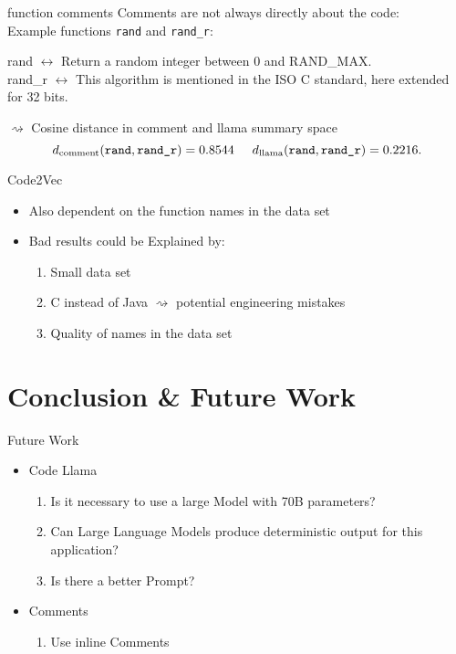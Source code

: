 \documentclass[aspectratio=1610,12pt]{beamer}
\begin{document}
\begin{frame}{function comments}
  Comments are not always directly about the code:\\
  Example functions \texttt{rand} and \texttt{rand\_r}:
  \begin{center}
    rand $\leftrightarrow$ Return a random integer between 0
      and RAND\_MAX.\\
    rand\_r  $\leftrightarrow$ This algorithm is mentioned in 
    the ISO C standard, here extended for 32 bits.
  \end{center}
  $\rightsquigarrow$ Cosine distance in comment and 
  llama summary space
    \[
      d_\text{comment}(\texttt{rand}, \texttt{rand\_r}) = 0.8544
      \hspace{0.5cm}
      d_\text{llama}(\texttt{rand}, \texttt{rand\_r}) = 0.2216.
    \]
\end{frame}

\begin{frame}{Code2Vec}
  \begin{itemize}
    \item Also dependent on the function names in the data set
    \item Bad results could be Explained by:
      \begin{enumerate}
        \item Small data set
        \item C instead of Java $\rightsquigarrow$ potential engineering mistakes
        \item Quality of names in the data set
      \end{enumerate}
  \end{itemize}
\end{frame}

\section{Conclusion \& Future Work}
\begin{frame}{Future Work}
  \begin{itemize}
    \item Code Llama
      \begin{enumerate}
        \item Is it necessary to use a 
          large Model with 70B parameters?
        \item Can Large Language Models 
        produce deterministic output for this application?
        \item Is there a better Prompt?
      \end{enumerate}
    \item Comments
      \begin{enumerate}
        \item Use inline Comments
      \end{enumerate}
  \end{itemize}
\end{frame}
\end{document}
